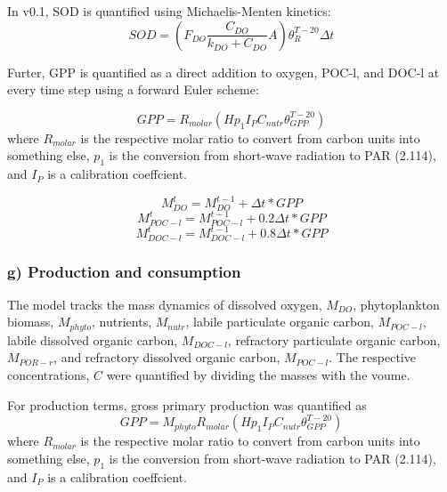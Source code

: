 \documentclass[
  letterpaper,
  DIV=11,
  numbers=noendperiod]{scrartcl}
\begin{document}
\begin{tcolorbox}[enhanced jigsaw, colframe=quarto-callout-note-color-frame, leftrule=.75mm, arc=.35mm, coltitle=black, titlerule=0mm, rightrule=.15mm, title=\textcolor{quarto-callout-note-color}{\faInfo}\hspace{0.5em}{Note}, colbacktitle=quarto-callout-note-color!10!white, bottomtitle=1mm, toprule=.15mm, colback=white, left=2mm, opacitybacktitle=0.6, breakable, toptitle=1mm, bottomrule=.15mm, opacityback=0]

In v0.1, SOD is quantified using Michaelis-Menten kinetics: \[
SOD = (F_{DO} \frac{C_{DO}}{k_{DO} + C_{DO}} A)\theta_{R}^{T-20} \Delta t
\]

Furter, GPP is quantified as a direct addition to oxygen, POC-l, and
DOC-l at every time step using a forward Euler scheme:

\[
GPP = R_{molar} (H p_1 I_P C_{nutr} \theta_{GPP}^{T-20})
\] where \(R_{molar}\) is the respective molar ratio to convert from
carbon units into something else, \(p_1\) is the conversion from
short-wave radiation to PAR (2.114), and \(I_P\) is a calibration
coeffcient.

\[
M_{DO}^{t} = M_{DO}^{t-1} + \Delta t * GPP 
\] \[
M_{POC-l}^{t} = M_{POC-l}^{t-1} + 0.2 \Delta t * GPP 
\] \[
M_{DOC-l}^{t} = M_{DOC-l}^{t-1} + 0.8 \Delta t * GPP 
\]

\end{tcolorbox}

\hypertarget{g-production-and-consumption}{%
\subsubsection{g) Production and
consumption}\label{g-production-and-consumption}}

The model tracks the mass dynamics of dissolved oxygen, \(M_{DO}\),
phytoplankton biomass, \(M_{phyto}\), nutrients, \(M_{nutr}\), labile
particulate organic carbon, \(M_{POC-l}\), labile dissolved organic
carbon, \(M_{DOC-l}\), refractory particulate organic carbon,
\(M_{POR-r}\), and refractory dissolved organic carbon, \(M_{POC-l}\).
The respective concentrations, \(C\) were quantified by dividing the
masses with the voume.

For production terms, gross primary production was quantified as \[
GPP = M_{phyto} R_{molar} (H p_1 I_P C_{nutr} \theta_{GPP}^{T-20})
\] where \(R_{molar}\) is the respective molar ratio to convert from
carbon units into something else, \(p_1\) is the conversion from
short-wave radiation to PAR (2.114), and \(I_P\) is a calibration
coeffcient.
\end{document}
